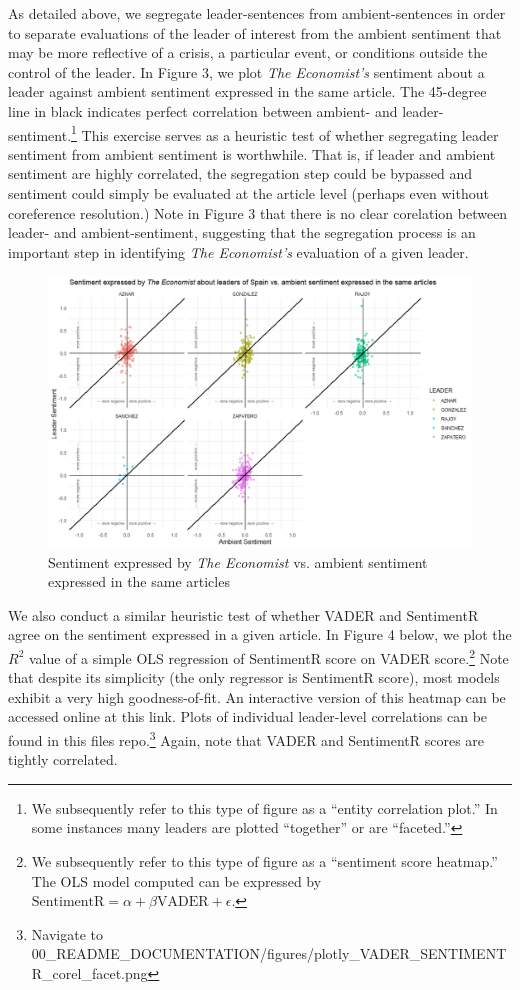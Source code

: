 \documentclass[11pt, letterpaper, twoside]{article}
\begin{document}
As detailed above, we segregate leader-sentences from ambient-sentences in order to separate evaluations of the leader of interest from the ambient sentiment that may be more reflective of a crisis, a particular event, or conditions outside the control of the leader. In Figure 3, we plot \textit{The Economist's} sentiment about a leader against ambient sentiment expressed in the same article. The 45-degree line in black indicates perfect correlation between ambient- and leader-sentiment.\footnote{We subsequently refer to this type of figure as a ``entity correlation plot.'' In some instances many leaders are plotted ``together'' or are ``faceted.''} This exercise serves as a heuristic test of whether segregating leader sentiment from ambient sentiment is worthwhile. That is, if leader and ambient sentiment are highly correlated, the segregation step could be bypassed and sentiment could simply be evaluated at the article level (perhaps even without coreference resolution.) Note in Figure 3 that there is no clear corelation between leader- and ambient-sentiment, suggesting that the segregation process is an important step in identifying \textit{The Economist's} evaluation of a given leader.\\

\begin{figure}
    \caption{Sentiment expressed by \textit{The Economist} vs. ambient sentiment expressed in the same articles}
    \centering
    \includegraphics[clip, width=\textwidth]{figures/230_corel_facet.png}
\end{figure}


We also conduct a similar heuristic test of whether VADER and SentimentR agree on the sentiment expressed in a given article. In Figure 4 below, we plot the $R^2$ value of a simple OLS regression of SentimentR score on VADER score.\footnote{We subsequently refer to this type of figure as a ``sentiment score heatmap.'' The OLS model computed can be expressed by $\text{SentimentR} = \alpha +\beta \text{VADER} + \epsilon$. } Note that despite its simplicity (the only regressor is SentimentR score), most models exhibit a very high goodness-of-fit. An interactive version of this heatmap can be accessed online at this link. Plots of individual leader-level correlations can be found in this files repo.\footnote{Navigate to 00_README_DOCUMENTATION/figures/plotly_VADER_SENTIMENTR_corel_facet.png} Again, note that VADER and SentimentR scores are tightly correlated.
\end{document}
